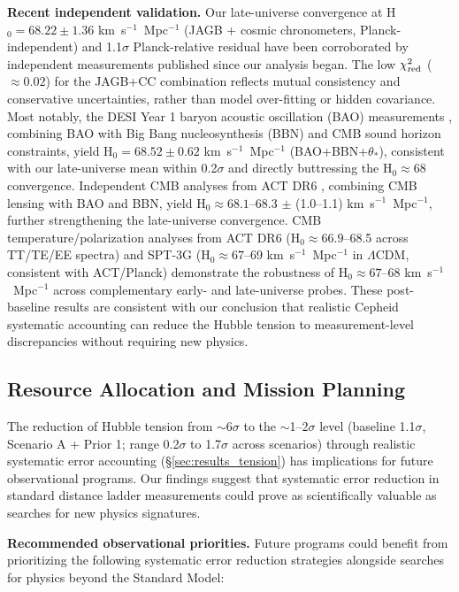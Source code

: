 \documentclass[preprint, linenumbers]{aastex701}
\begin{document}
\textbf{Recent independent validation.} Our late-universe convergence at H$_0 = 68.22 \pm 1.36$ km~s$^{-1}$~Mpc$^{-1}$ (JAGB + cosmic chronometers, Planck-independent) and 1.1$\sigma$ Planck-relative residual have been corroborated by independent measurements published since our analysis began. The low $\chi^2_{\rm red}$ ($\approx 0.02$) for the JAGB+CC combination reflects mutual consistency and conservative uncertainties, rather than model over-fitting or hidden covariance. Most notably, the DESI Year 1 baryon acoustic oscillation (BAO) measurements \citep{DESI2025}, combining BAO with Big Bang nucleosynthesis (BBN) and CMB sound horizon constraints, yield H$_0 = 68.52 \pm 0.62$ km~s$^{-1}$~Mpc$^{-1}$ (BAO+BBN+$\theta_*$), consistent with our late-universe mean within 0.2$\sigma$ and directly buttressing the H$_0 \approx 68$ convergence. Independent CMB analyses from ACT DR6 \citep{ACT_DR6_Lensing}, combining CMB lensing with BAO and BBN, yield H$_0 \approx 68.1$--68.3 $\pm$ (1.0--1.1) km~s$^{-1}$~Mpc$^{-1}$, further strengthening the late-universe convergence. CMB temperature/polarization analyses from ACT DR6 (H$_0 \approx 66.9$--68.5 across TT/TE/EE spectra) and SPT-3G \citep{SPT2025} (H$_0 \approx 67$--69 km~s$^{-1}$~Mpc$^{-1}$ in $\Lambda$CDM, consistent with ACT/Planck) demonstrate the robustness of H$_0 \approx 67$--68 km~s$^{-1}$~Mpc$^{-1}$ across complementary early- and late-universe probes. These post-baseline results are consistent with our conclusion that realistic Cepheid systematic accounting can reduce the Hubble tension to measurement-level discrepancies without requiring new physics.

\subsection{Resource Allocation and Mission Planning} \label{sec:discussion_resources}

The reduction of Hubble tension from $\sim$6$\sigma$ to the $\sim$1--2$\sigma$ level (baseline 1.1$\sigma$, Scenario A + Prior 1; range 0.2$\sigma$ to 1.7$\sigma$ across scenarios) through realistic systematic error accounting (\S\ref{sec:results_tension}) has implications for future observational programs. Our findings suggest that systematic error reduction in standard distance ladder measurements could prove as scientifically valuable as searches for new physics signatures.

\textbf{Recommended observational priorities.} Future programs could benefit from prioritizing the following systematic error reduction strategies alongside searches for physics beyond the Standard Model:
\end{document}
